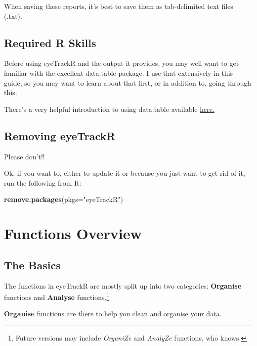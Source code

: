 \documentclass[]{book}
\newenvironment{Shaded}{\begin{snugshade}}{\end{snugshade}}
\newcommand{\DataTypeTok}[1]{\textcolor[rgb]{0.13,0.29,0.53}{#1}}
\newcommand{\KeywordTok}[1]{\textcolor[rgb]{0.13,0.29,0.53}{\textbf{#1}}}
\newcommand{\NormalTok}[1]{#1}
\newcommand{\StringTok}[1]{\textcolor[rgb]{0.31,0.60,0.02}{#1}}
\let\rmarkdownfootnote\footnote%
\def\footnote{\protect\rmarkdownfootnote}
\begin{document}
When saving these reports, it's best to save them as tab-delimited text files (.txt).

\hypertarget{required-r-skills}{%
\section{Required R Skills}\label{required-r-skills}}

Before using eyeTrackR and the output it provides, you may well want to get familiar with the excellent data.table package. I use that extensively in this guide, so you may want to learn about that first, or in addition to, going through this.

There's a very helpful introduction to using data.table available \href{https://cran.r-project.org/web/packages/data.table/vignettes/datatable-intro.html}{here.}

\hypertarget{removing-eyetrackr}{%
\section{Removing eyeTrackR}\label{removing-eyetrackr}}

Please don't!!

Ok, if you want to, either to update it or because you just want to get rid of it, run the following from R:

\begin{Shaded}
\begin{Highlighting}[]
\KeywordTok{remove.packages}\NormalTok{(}\DataTypeTok{pkgs=}\StringTok{"eyeTrackR"}\NormalTok{)}
\end{Highlighting}
\end{Shaded}

\hypertarget{functionsOverview}{%
\chapter{Functions Overview}\label{functionsOverview}}

\hypertarget{the-basics}{%
\section{The Basics}\label{the-basics}}

The functions in eyeTrackR are mostly split up into two categories: \textbf{Organise} functions and \textbf{Analyse} functions.\footnote{Future versions may include \emph{OrganiZe} and \emph{AnalyZe} functions, who knows.}

\textbf{Organise} functions are there to help you clean and organise your data.
\end{document}
